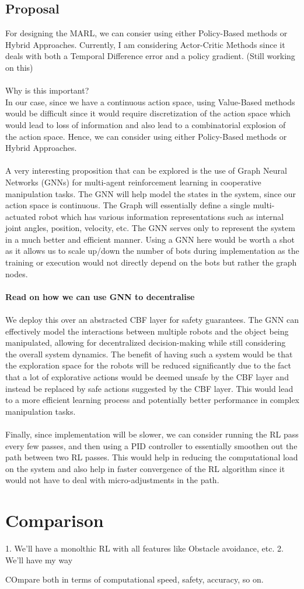 \documentclass[12pt,english]{report}
\begin{document}
\section{Proposal}
For designing the MARL, we can consier using either Policy-Based methods or Hybrid Approaches. Currently, I am considering Actor-Critic Methods since it deals with both a Temporal Difference error and a policy gradient. (Still working on this)\\
\\ 
Why is this important?\\
In our case, since we have a continuous action space, using Value-Based methods would be difficult since it would require discretization of the action space which would lead to loss of information and also lead to a combinatorial explosion of the action space. Hence, we can consider using either Policy-Based methods or Hybrid Approaches.\\
\\
A very interesting proposition that can be explored is the use of Graph Neural Networks (GNNs) for multi-agent reinforcement learning in cooperative manipulation tasks. The GNN will help model the states in the system, since our action space is continuous. The Graph will essentially define a single multi-actuated robot which has various information representations such as internal joint angles, position, velocity, etc. The GNN serves only to represent the system in a much better and efficient manner. Using a GNN here would be worth a shot as it allows us to scale up/down the number of bots during implementation as the training or execution would not directly depend on the bots but rather the graph nodes.\\
\\ \textbf{Read on how we can use GNN to decentralise}\\ \\
We deploy this over an abstracted CBF layer for safety guarantees. The GNN can effectively model the interactions between multiple robots and the object being manipulated, allowing for decentralized decision-making while still considering the overall system dynamics. The benefit of having such a system would be that the exploration space for the robots will be reduced significantly due to the fact that a lot of explorative actions would be deemed unsafe by the CBF layer and instead be replaced by safe actions suggested by the CBF layer. This would lead to a more efficient learning process and potentially better performance in complex manipulation tasks.\\
\\
Finally, since implementation will be slower, we can consider running the RL pass every few passes, and then using a PID controller to essentially smoothen out the path between two RL passes. This would help in reducing the computational load on the system and also help in faster convergence of the RL algorithm since it would not have to deal with micro-adjustments in the path.

\chapter{Comparison}
1. We'll have a monolthic RL with all features like Obstacle avoidance, etc. 
2. We'll have my way

COmpare both in terms of computational speed, safety, accuracy, so on. 


\listoffigures
\end{document}
